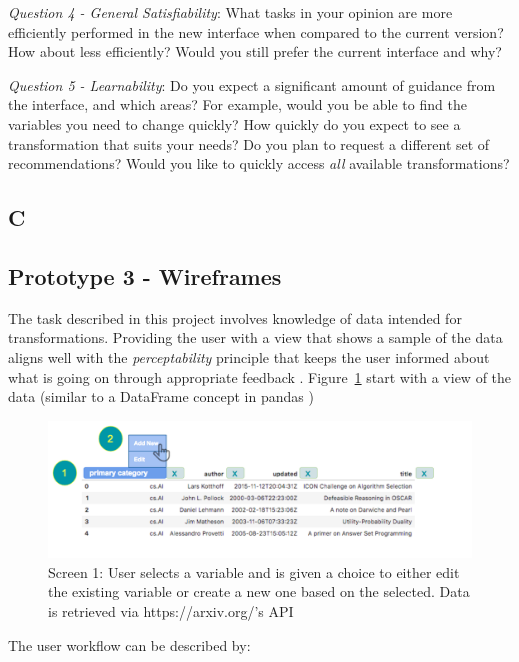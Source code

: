 \documentclass[12pt,letterpaper]{article}
\begin{document}
\textit{Question 4 - General Satisfiability}: What tasks in your opinion are more efficiently performed in the new interface when compared to the current version? How about less efficiently? Would you still prefer the current interface and why? 

\textit{Question 5 - Learnability}: Do you expect a significant amount of guidance from the interface, and which areas? For example, would you be able to find the variables you need to change quickly? How quickly do you expect to see a transformation that suits your needs? Do you plan to request a different set of recommendations? Would you like to quickly access \textit{all} available transformations? 

\subsection*{C}

\subsection*{Prototype 3 - Wireframes}
The task described in this project involves knowledge of data intended for transformations. Providing the user with a view that shows a sample of the data aligns well with the \textit{perceptability} principle that keeps the user informed about what is going on through appropriate feedback \cite{nielsen1994usability}. Figure~\ref{fig::2} start with a view of the data (similar to a DataFrame concept in pandas \cite{mckinney2011pandas})

\begin{figure}[h]
\centering
\includegraphics[scale=.3]{figures/m3/wireframe-screen1.png}
\caption{Screen 1: User selects a variable and is given a choice to either edit the existing variable or create a new one based on the selected. Data is retrieved via https://arxiv.org/'s API}
\label{fig::2}
\end{figure}

The user workflow can be described by: 
\end{document}
